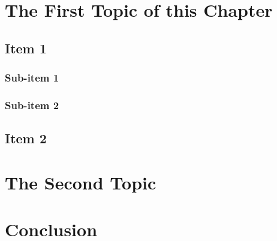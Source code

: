 \section{The First Topic of this Chapter}
\subsection{Item 1}
\subsubsection{Sub-item 1}


\subsubsection{Sub-item 2}


\subsection{Item 2}


\section{The Second Topic}


\section{Conclusion}

